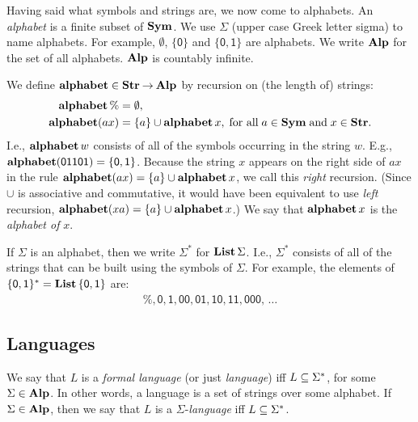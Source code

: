 %
Having said what symbols and strings are, we now come to alphabets.
An \emph{alphabet}
%
is a finite subset of $\mathbf{Sym}$.  We use $\Sigma$
%
%
(upper case Greek letter sigma) to name alphabets.  For example,
$\emptyset$, $\mathsf{\{0\}}$ and $\mathsf{\{0,1\}}$ are alphabets.
We write $\mathbf{Alp}$ for the set of all alphabets.  $\mathbf{Alp}$ is countably
infinite.
%

We define $\mathbf{alphabet}\in\mathbf{Str}\mathbin{\to}\mathbf{Alp}$
%
%
%
by recursion
%
%
%
on (the length of) strings:
\begin{align*}
\mathbf{alphabet}\,\% &= \emptyset , \\
\mathbf{alphabet}(ax) &= \{a\} \cup \mathbf{alphabet}\,x,
\;\allowbreak\mbox{for all}\allowbreak\;a\in\mathbf{Sym}\;\allowbreak\mbox{and}\allowbreak\;x\in\mathbf{Str} .
\end{align*}
I.e., $\mathbf{alphabet}\,w$ consists of all of the symbols occurring in the
string $w$.  E.g., $\mathbf{alphabet}(\mathsf{01101})=\{\mathsf{0},\mathsf{1}\}$.
Because the string $x$ appears on the right side of $ax$ in the rule
$\mathbf{alphabet}(ax) = \{a\} \cup \mathbf{alphabet}\,x$, we call this \emph{right}
recursion.  (Since $\cup$ is associative and commutative, it would
have been equivalent to use \emph{left} recursion, $\mathbf{alphabet}(xa) =
\{a\} \cup \mathbf{alphabet}\,x$.)  We say that $\mathbf{alphabet}\,x$ is the
\emph{alphabet of} $x$.

If $\Sigma$ is an alphabet, then we write $\Sigma^*$
%
%
for $\mathbf{List}\,\Sigma$.
I.e., $\Sigma^*$ consists of all of the strings that can be built
using the symbols of $\Sigma$.
For example, the elements of $\mathsf{\{0,1\}^*} = \mathbf{List}\,\mathsf{\{0,1\}}$ are:
\begin{gather*}
\%, \mathsf{0}, \mathsf{1}, \mathsf{00}, \mathsf{01}, \mathsf{10},
\mathsf{11},\mathsf{000},\, \ldots
\end{gather*}
%

\subsection{Languages}

%
We say that $L$ is a \emph{formal language}
%
(or just \emph{language}) iff $L\subseteq\Sigma^*$, for some
$\Sigma\in\mathbf{Alp}$.  In other words, a language is a set of strings over
some alphabet.
If $\Sigma\in\mathbf{Alp}$, then we say that $L$ is a
$\Sigma$-\emph{language}
%
%
iff $L\subseteq\Sigma^*$.

